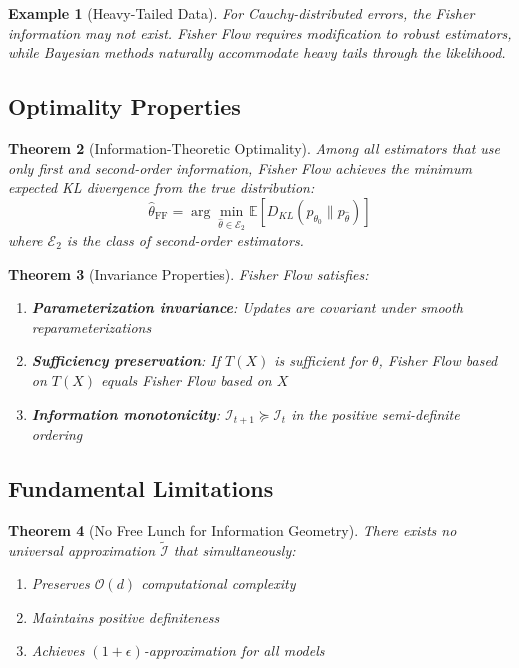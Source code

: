 \documentclass[11pt]{article}
\newtheorem{theorem}{Theorem}
\newtheorem{example}[theorem]{Example}
\begin{document}
\begin{example}[Heavy-Tailed Data]
For Cauchy-distributed errors, the Fisher information may not exist. Fisher Flow requires modification to robust estimators, while Bayesian methods naturally accommodate heavy tails through the likelihood.
\end{example}

\subsection{Optimality Properties}

\begin{theorem}[Information-Theoretic Optimality]
\label{thm:info_optimality}
Among all estimators that use only first and second-order information, Fisher Flow achieves the minimum expected KL divergence from the true distribution:
\begin{equation}
\hat{\theta}_{\text{FF}} = \arg\min_{\hat{\theta} \in \mathcal{E}_2} \mathbb{E}[D_{KL}(p_{\theta_0} \| p_{\hat{\theta}})]
\end{equation}
where $\mathcal{E}_2$ is the class of second-order estimators.
\end{theorem}

\begin{theorem}[Invariance Properties]
Fisher Flow satisfies:
\begin{enumerate}
\item \textbf{Parameterization invariance}: Updates are covariant under smooth reparameterizations
\item \textbf{Sufficiency preservation}: If $T(X)$ is sufficient for $\theta$, Fisher Flow based on $T(X)$ equals Fisher Flow based on $X$
\item \textbf{Information monotonicity}: $\mathcal{I}_{t+1} \succeq \mathcal{I}_t$ in the positive semi-definite ordering
\end{enumerate}
\end{theorem}

\subsection{Fundamental Limitations}

\begin{theorem}[No Free Lunch for Information Geometry]
\label{thm:no_free_lunch}
There exists no universal approximation $\tilde{\mathcal{I}}$ that simultaneously:
\begin{enumerate}
\item Preserves $\mathcal{O}(d)$ computational complexity
\item Maintains positive definiteness
\item Achieves $(1+\epsilon)$-approximation for all models
\end{enumerate}
\end{theorem}
\end{document}
